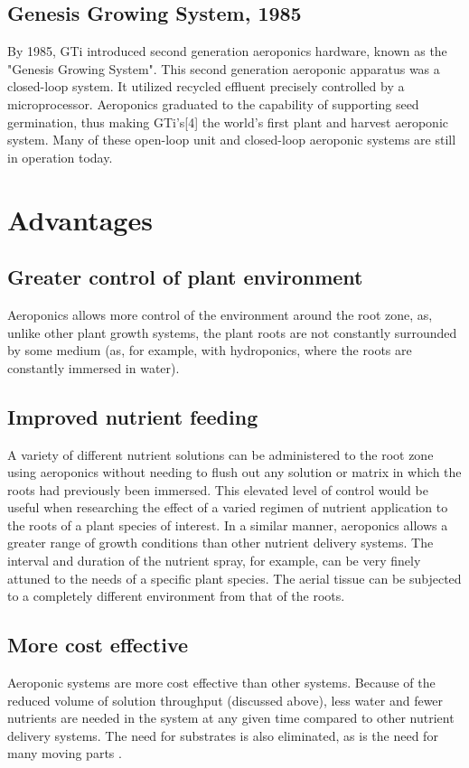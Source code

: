\documentclass{article}
\begin{document}
\subsection{Genesis Growing System, 1985}
By 1985, GTi introduced second generation aeroponics hardware, known as the "Genesis Growing System". This second generation aeroponic apparatus was a closed-loop system. It utilized recycled effluent precisely controlled by a microprocessor. Aeroponics graduated to the capability of supporting seed germination, thus making GTi's[4] the world's first plant and harvest aeroponic system.
Many of these open-loop unit and closed-loop aeroponic systems are still in operation today.
\section{Advantages}
\subsection{Greater control of plant environment}
Aeroponics allows more control of the environment around the root zone, as, unlike other plant growth systems, the plant roots are not constantly surrounded by some medium (as, for example, with hydroponics, where the roots are constantly immersed in water).
\subsection{Improved nutrient feeding}
A variety of different nutrient solutions can be administered to the root zone using aeroponics without needing to flush out any solution or matrix in which the roots had previously been immersed. This elevated level of control would be useful when researching the effect of a varied regimen of nutrient application to the roots of a plant species of interest. In a similar manner, aeroponics allows a greater range of growth conditions than other nutrient delivery systems. The interval and duration of the nutrient spray, for example, can be very finely attuned to the needs of a specific plant species. The aerial tissue can be subjected to a completely different environment from that of the roots.
\subsection{More cost effective}
Aeroponic systems are more cost effective than other systems. Because of the reduced volume of solution throughput (discussed above), less water and fewer nutrients are needed in the system at any given time compared to other nutrient delivery systems. The need for substrates is also eliminated, as is the need for many moving parts .
\end{document}
